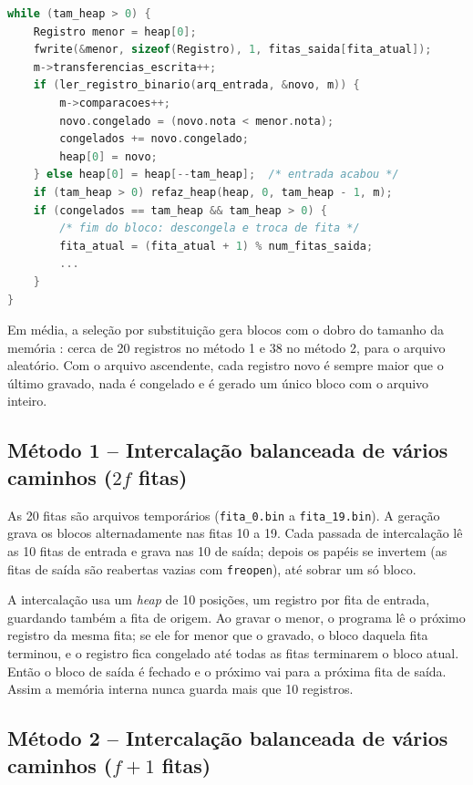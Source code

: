 \documentclass{article}
\begin{document}
\begin{lstlisting}[caption={Laço da seleção por substituição (int2f.c, resumido).},label={lst:selecao},language=C]
while (tam_heap > 0) {
    Registro menor = heap[0];
    fwrite(&menor, sizeof(Registro), 1, fitas_saida[fita_atual]);
    m->transferencias_escrita++;
    if (ler_registro_binario(arq_entrada, &novo, m)) {
        m->comparacoes++;
        novo.congelado = (novo.nota < menor.nota);
        congelados += novo.congelado;
        heap[0] = novo;
    } else heap[0] = heap[--tam_heap];  /* entrada acabou */
    if (tam_heap > 0) refaz_heap(heap, 0, tam_heap - 1, m);
    if (congelados == tam_heap && tam_heap > 0) {
        /* fim do bloco: descongela e troca de fita */
        fita_atual = (fita_atual + 1) % num_fitas_saida;
        ...
    }
}
\end{lstlisting}

Em média, a seleção por substituição gera blocos com o dobro do tamanho da memória \cite{knuth1998}: cerca de 20 registros no método 1 e 38 no método 2, para o arquivo aleatório. Com o arquivo ascendente, cada registro novo é sempre maior que o último gravado, nada é congelado e é gerado um único bloco com o arquivo inteiro.

\subsection{Método 1 -- Intercalação balanceada de vários caminhos ($2f$ fitas)}

As 20 fitas são arquivos temporários (\texttt{fita\_0.bin} a \texttt{fita\_19.bin}). A geração grava os blocos alternadamente nas fitas 10 a 19. Cada passada de intercalação lê as 10 fitas de entrada e grava nas 10 de saída; depois os papéis se invertem (as fitas de saída são reabertas vazias com \texttt{freopen}), até sobrar um só bloco.

A intercalação usa um \emph{heap} de 10 posições, um registro por fita de entrada, guardando também a fita de origem. Ao gravar o menor, o programa lê o próximo registro da mesma fita; se ele for menor que o gravado, o bloco daquela fita terminou, e o registro fica congelado até todas as fitas terminarem o bloco atual. Então o bloco de saída é fechado e o próximo vai para a próxima fita de saída. Assim a memória interna nunca guarda mais que 10 registros.

\subsection{Método 2 -- Intercalação balanceada de vários caminhos ($f+1$ fitas)}
\end{document}
